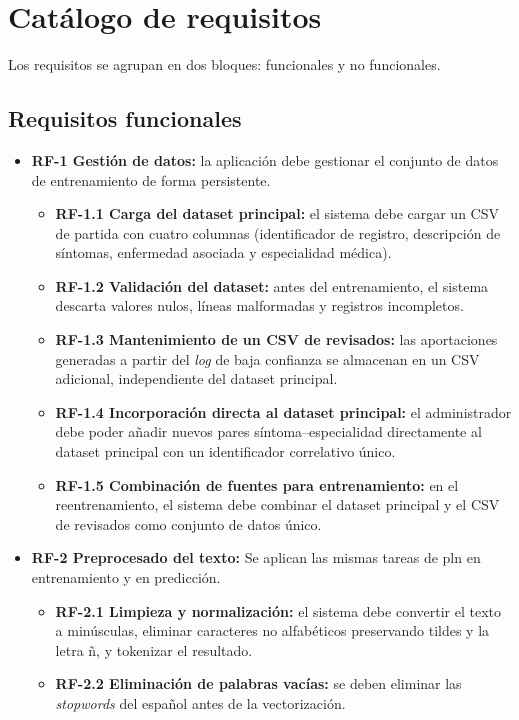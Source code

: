 \section{Catálogo de requisitos}

Los requisitos se agrupan en dos bloques: funcionales y no funcionales.

\subsection*{Requisitos funcionales}

\begin{itemize}
	\item \textbf{RF-1 Gestión de datos:} la aplicación debe gestionar el conjunto de datos de entrenamiento de forma persistente.
	\begin{itemize}
		\item \textbf{RF-1.1 Carga del dataset principal:} el sistema debe cargar un CSV de partida con cuatro columnas (identificador de registro, descripción de síntomas, enfermedad asociada y especialidad médica).
		\item \textbf{RF-1.2 Validación del dataset:} antes del entrenamiento, el sistema descarta valores nulos, líneas malformadas y registros incompletos.
		\item \textbf{RF-1.3 Mantenimiento de un CSV de revisados:} las aportaciones generadas a partir del \textit{log} de baja confianza se almacenan en un CSV adicional, independiente del dataset principal.
		\item \textbf{RF-1.4 Incorporación directa al dataset principal:} el administrador debe poder añadir nuevos pares síntoma--especialidad directamente al dataset principal con un identificador correlativo único.
		\item \textbf{RF-1.5 Combinación de fuentes para entrenamiento:} en el reentrenamiento, el sistema debe combinar el dataset principal y el CSV de revisados como conjunto de datos único.
	\end{itemize}
	\item \textbf{RF-2 Preprocesado del texto:} Se aplican las mismas tareas de \gls{pln} en entrenamiento y en predicción.
	\begin{itemize}
		\item \textbf{RF-2.1 Limpieza y normalización:} el sistema debe convertir el texto a minúsculas, eliminar caracteres no alfabéticos preservando tildes y la letra ñ, y tokenizar el resultado.
		\item \textbf{RF-2.2 Eliminación de palabras vacías:} se deben eliminar las \textit{stopwords} del español antes de la vectorización.

\end{itemize}
\end{itemize}
